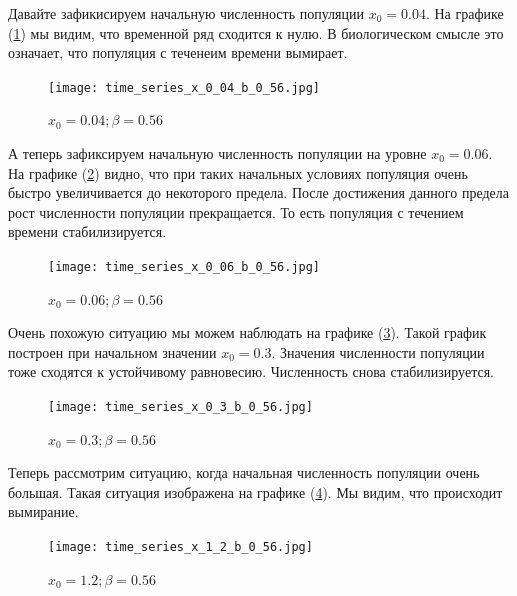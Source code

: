         Давайте зафикисируем начальную численность популяции \(x_0 = 0.04\). На графике (\ref{time_series_x_0_04_b_0_56}) мы видим, что временной ряд сходится к нулю. В биологическом смысле это означает, что популяция с теченеим времени вымирает.
    
        \begin{figure}
            \centering
            \texttt{[image: time\_series\_x\_0\_04\_b\_0\_56.jpg]}

            \captionsetup{justification=centering}
            \caption{\(x_0 = 0.04; \beta = 0.56\)}
            \label{time_series_x_0_04_b_0_56}
        \end{figure}

        А теперь зафиксируем начальную численность популяции на уровне \(x_0 = 0.06\). На графике (\ref{time_series_x_0_06_b_0_56}) видно, что при таких начальных условиях популяция очень быстро увеличивается до некоторого предела. После достижения данного предела рост численности популяции прекращается. То есть популяция с течением времени стабилизируется.
    
        \begin{figure}
            \centering
            \texttt{[image: time\_series\_x\_0\_06\_b\_0\_56.jpg]}

            \captionsetup{justification=centering}
            \caption{\(x_0 = 0.06; \beta = 0.56\)}
            \label{time_series_x_0_06_b_0_56}
        \end{figure}

        Очень похожую ситуацию мы можем наблюдать на графике (\ref{time_series_x_0_3_b_0_56}). Такой график построен при начальном значении \(x_0 = 0.3\). Значения численности популяции тоже сходятся к устойчивому равновесию. Численность снова стабилизируется.
    
        \begin{figure}
            \centering
            \texttt{[image: time\_series\_x\_0\_3\_b\_0\_56.jpg]}

            \captionsetup{justification=centering}
            \caption{\(x_0 = 0.3; \beta = 0.56\)}
            \label{time_series_x_0_3_b_0_56}
        \end{figure}

        Теперь рассмотрим ситуацию, когда начальная численность популяции очень большая. Такая ситуация изображена на графике (\ref{time_series_x_1_2_b_0_56}). Мы видим, что происходит вымирание.
    
        \begin{figure}[h!]
            \centering
            \texttt{[image: time\_series\_x\_1\_2\_b\_0\_56.jpg]}

            \captionsetup{justification=centering}
            \caption{\(x_0 = 1.2; \beta = 0.56\)}
            \label{time_series_x_1_2_b_0_56}
        \end{figure}

